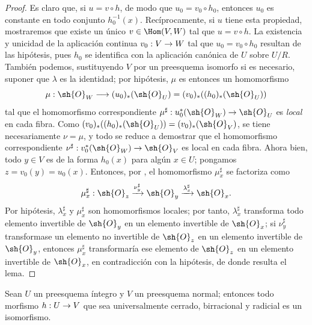 \documentclass[oneside,10pt]{amsart}
\makeatletter
\newcommand{\ega@arrow}[2]{\mathchoice{#1}{#2}{#2}{#2}}
\renewcommand{\to}{\ega@arrow{\longrightarrow}{\rightarrow}}
\let\EGAOriginalLabel\label
\renewcommand{\label}[1]{\phantomsection\EGAOriginalLabel{#1}}
\makeatother
\begin{document}
\begin{proof}
Es claro que, si $u=v\circ h$, de modo que $u_0=v_0\circ h_0$, entonces $u_0$ es constante en todo conjunto $h_0^{-1}(x)$.
Recíprocamente, si $u$ tiene esta propiedad, mostraremos que existe un único $v\in\Hom(V,W)$ tal que $u=v\circ h$.
La existencia y unicidad de la aplicación continua $v_0:V\to W$ tal que $u_0=v_0\circ h_0$ resultan de las hipótesis, pues $h_0$ se identifica con la aplicación canónica de $U$ sobre $U/R$.
También podemos, sustituyendo $V$ por un preesquema isomorfo si es necesario, suponer que $\lambda$ es la identidad;
por hipótesis, $\mu$ es entonces un homomorfismo
\[
    \mu:\sh{O}_W\longrightarrow(u_0)_*(\sh{O}_U)
    =(v_0)_*((h_0)_*(\sh{O}_U))
\]
tal que el homomorfismo correspondiente $\mu^\sharp:u_0^*(\sh{O}_W)\to\sh{O}_U$ es \emph{local} en cada fibra.
Como $(v_0)_*((h_0)_*(\sh{O}_U))=(v_0)_*(\sh{O}_V)$, se tiene necesariamente $\nu=\mu$, y todo se reduce a demostrar que el homomorfismo correspondiente $\nu^\sharp:v_0^*(\sh{O}_W)\to\sh{O}_V$ es local en cada fibra.
Ahora bien, todo $y\in V$ es de la forma $h_0(x)$ para algún $x\in U$;
pongamos $z=v_0(y)=u_0(x)$.
Entonces, por , el homomorfismo $\mu_x^\sharp$ se factoriza como
\[
    \mu_x^\sharp:\sh{O}_z
    \xrightarrow{\nu_y^\sharp}\sh{O}_y
    \xrightarrow{\lambda_x^\sharp}\sh{O}_x.
\]
Por hipótesis, $\lambda_x^\sharp$ y $\mu_x^\sharp$ son homomorfismos locales;
por tanto, $\lambda_x^\sharp$ transforma todo elemento invertible de $\sh{O}_y$ en un elemento invertible de $\sh{O}_x$;
si $\nu_y^\sharp$ transformase un elemento no invertible de $\sh{O}_z$ en un elemento invertible de $\sh{O}_y$, entonces $\mu_x^\sharp$ transformaría ese elemento de $\sh{O}_z$ en un elemento invertible de $\sh{O}_x$, en contradicción con la hipótesis, de donde resulta el lema.
\end{proof}

\begin{corollary}[8.11.2]
\label{II.8.11.2}
Sean $U$ un preesquema íntegro y $V$ un preesquema normal;
entonces todo morfismo $h:U\to V$ que sea universalmente cerrado, birracional y radicial es un isomorfismo.
\end{corollary}
\end{document}
